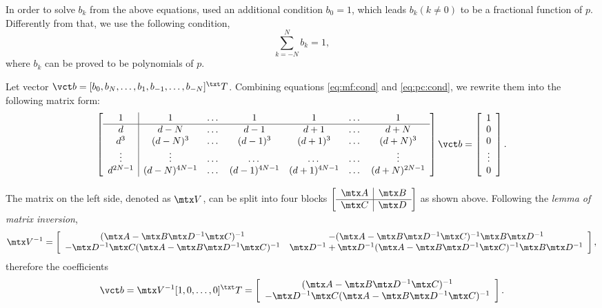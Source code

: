 In order to solve $b_k$ from the above equations,
\cite{thiran1971recursive} used an additional condition $b_0=1$,
which leads $b_k(k\neq 0)$ to be a fractional function of $p$.
Differently from that, we use the following condition,
\begin{equation}\label{eq:pc:cond}
\sum_{k=-N}^N b_k =1,
\end{equation}
where $b_k$ can be proved to be polynomials of $p$.

Let vector $\vct b=[b_0,b_N,\dots,b_1,b_{-1},\dots,b_{-N}]^\txt T$.
Combining equations \ref{eq:mf:cond} and \ref{eq:pc:cond},
we rewrite them into the following matrix form:
\[
\left[\begin{array}{c|cccccc}
1 & 1 & \dots & 1 & 1 & \dots & 1 \\ \hline
d & d-N &\dots &d-1 & d+1 &\dots & d+N \\
d^3 & (d-N)^3 & \dots & (d-1)^3 & (d+1)^3 &\dots & (d+N)^3 \\
\vdots & \vdots &\dots &\dots &\dots &\dots &\vdots \\
d^{2N-1} & (d-N)^{4N-1} & \dots & (d-1)^{4N-1} 
& (d+1)^{4N-1} &\dots & (d+N)^{2N-1}
\end{array}\right]\vct b=
\left[\begin{array}{c}
1 \\ 0 \\ 0 \\ \vdots \\ 0
\end{array}\right].
\]

The matrix on the left side, denoted as $\mtx V$, 
can be split into four blocks
$\left[\begin{array}{c|c}
\mtx A & \mtx B \\ \hline  \mtx C & \mtx D
\end{array}\right]$ 
as shown above.
Following the \textit{lemma of matrix inversion},
\begin{equation}
\mtx V^{-1}=\left[\begin{array}{cc}
(\mtx A-\mtx B\mtx D^{-1}\mtx C)^{-1} &
-(\mtx A-\mtx B\mtx D^{-1}\mtx C)^{-1}\mtx B\mtx D^{-1} \\
-\mtx D^{-1}\mtx C(\mtx A-\mtx B\mtx D^{-1}\mtx C)^{-1} &
\mtx D^{-1}+\mtx D^{-1}(\mtx A-\mtx B\mtx D^{-1}\mtx C)^{-1}\mtx B\mtx D^{-1} \\
\end{array}\right],
\end{equation}
therefore the coefficients
\begin{equation}\label{eq:sltn}
\vct b=\mtx V^{-1}[1,0,\dots,0]^\txt T=
\left[\begin{array}{c}
(\mtx A-\mtx B\mtx D^{-1}\mtx C)^{-1} \\
-\mtx D^{-1}\mtx C(\mtx A-\mtx B\mtx D^{-1}\mtx C)^{-1} 
\end{array}\right].
\end{equation}

